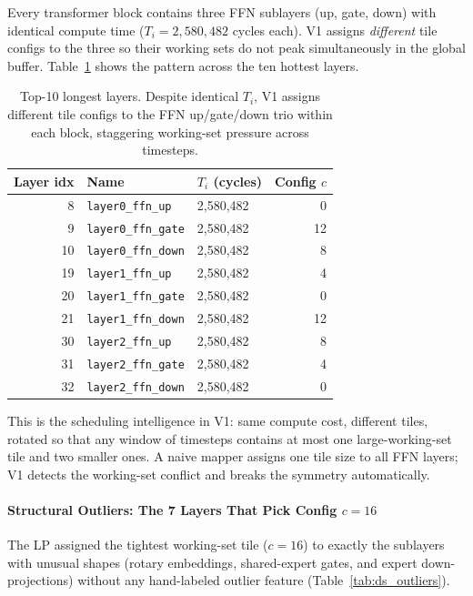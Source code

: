 Every transformer block contains three FFN sublayers (up, gate, down) with identical compute time ($T_i = 2{,}580{,}482$ cycles each). V1 assigns \emph{different} tile configs to the three so their working sets do not peak simultaneously in the global buffer.
Table~\ref{tab:ds_ffn_stagger} shows the pattern across the ten hottest layers.

\begin{table}[ht!]
\centering
\caption{Top-10 longest layers. Despite identical $T_i$, V1 assigns
different tile configs to the FFN up/gate/down trio within each block, staggering working-set pressure across timesteps.}
\label{tab:ds_ffn_stagger}
\begin{tabular}{rllr}
\toprule
\textbf{Layer idx} & \textbf{Name} &
\textbf{$T_i$ (cycles)} & \textbf{Config $c$} \\
\midrule
 8 & \texttt{layer0\_ffn\_up}   & 2{,}580{,}482 &  0 \\
 9 & \texttt{layer0\_ffn\_gate} & 2{,}580{,}482 & 12 \\
10 & \texttt{layer0\_ffn\_down} & 2{,}580{,}482 &  8 \\
19 & \texttt{layer1\_ffn\_up}   & 2{,}580{,}482 &  4 \\
20 & \texttt{layer1\_ffn\_gate} & 2{,}580{,}482 &  0 \\
21 & \texttt{layer1\_ffn\_down} & 2{,}580{,}482 & 12 \\
30 & \texttt{layer2\_ffn\_up}   & 2{,}580{,}482 &  8 \\
31 & \texttt{layer2\_ffn\_gate} & 2{,}580{,}482 &  4 \\
32 & \texttt{layer2\_ffn\_down} & 2{,}580{,}482 &  0 \\
\bottomrule
\end{tabular}
\end{table}

This is the scheduling intelligence in V1: same compute cost,
different tiles, rotated so that any window of timesteps contains at most one large-working-set tile and two smaller ones. A naive mapper assigns one tile size to all FFN layers; V1 detects the working-set conflict and breaks the symmetry automatically.

\paragraph{Structural Outliers: The 7 Layers That Pick Config $c=16$}

The LP assigned the tightest working-set tile ($c = 16$) to exactly the sublayers with unusual shapes (rotary embeddings, shared-expert gates, and expert down-projections) without any hand-labeled outlier feature (Table~\ref{tab:ds_outliers}).

